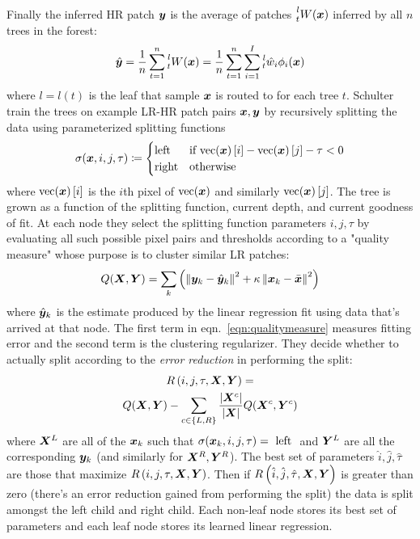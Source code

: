 %
Finally the inferred HR patch $\bm{y}$ is the average of patches $\prescript{l}{t}{W(\bm{x})}$ inferred by all $n$ trees in the forest:
\begin{equation}
    \hat{\bm{y}} = \frac{1}{n} \sum_{t=1}^{n} \prescript{l}{t}{W(\bm{x})} =  \frac{1}{n} \sum_{t=1}^{n} \sum_{i=1}^I \prescript{l}{t}{\hat{w}_i}\phi_i(\bm{x})
\end{equation}
where $l = l(t)$ is the leaf that sample $\bm{x}$ is routed to for each tree $t$.
%
Schulter \etal~ train the trees on example LR-HR patch pairs $\bm{x}, \bm{y}$ by recursively splitting the data using parameterized splitting functions
\begin{equation}
    \sigma(\bm{x}, i, j, \tau)\coloneqq {
    \begin{cases}
        \text{left} & \text{if } \text{vec}(\bm{x})\left[ i \right] - \text{vec}(\bm{x})\left[ j \right] - \tau < 0  \\
        \text{right} & \text{otherwise}
    \end{cases}
    }
\end{equation}
where $\text{vec}(\bm{x})\left[ i \right]$ is the $i$th pixel of $\text{vec}(\bm{x})$ and similarly $\text{vec}(\bm{x})\left[ j \right]$.
%
The tree is grown as a function of the splitting function, current depth, and current goodness of fit.
%
At each node they select the splitting function parameters $i, j, \tau$ by evaluating all such possible pixel pairs and thresholds according to a "quality measure" whose purpose is to cluster similar LR patches:
\begin{equation}
    Q(\bX, \bY) = \sum_k \left( \left\| \by_k - \hat{\by}_k \right\|^2 + \kappa\left\| \bx_k - \bar{\bx} \right\|^2 \right)
    \label{eqn:qualitymeasure}
\end{equation}
where $\hat{\bm{y}}_k$ is the estimate produced by the linear regression fit using data that's arrived at that node.
%
The first term in eqn.~\eqref{eqn:qualitymeasure} measures fitting error and the second term is the clustering regularizer.
%
They decide whether to actually split according to the \textit{error reduction} in performing the split:
\begin{multline*}
    R\left(i, j, \tau, \bm{X}, \bm{Y} \right) = \\ Q(\bm{X}, \bm{Y}) - \sum_{c\in\left\{L, R\right\}} \frac{|\bm{X}^c|}{|\bm{X}|} Q(\bm{X}^c, \bm{Y}^c)
\end{multline*}
where $\bm{X}^L$ are all of the $\bm{x}_k$ such that $\sigma(\bm{x}_k, i, j, \tau) = \text{ left }$ and $\bm{Y}^L$ are all the corresponding $\bm{y}_k$ (and similarly for $\bm{X}^R, \bm{Y}^R$).
%
The best set of parameters $\hat{i}, \hat{j}, \hat{\tau}$ are those that maximize $R\left(i, j, \tau, \bm{X}, \bm{Y} \right)$.
%
Then if $R\left(\hat{i}, \hat{j}, \hat{\tau}, \bm{X}, \bm{Y} \right)$ is greater than zero (there's an error reduction gained from performing the split) the data is split amongst the left child and right child.
%
Each non-leaf node stores its best set of parameters and each leaf node stores its learned linear regression.